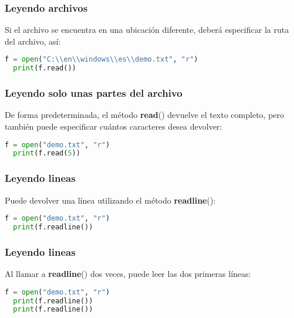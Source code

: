 \begin{frame}[fragile]
  \frametitle{Leyendo archivos}

  Si el archivo se encuentra en una ubicación diferente,
  deberá especificar la ruta del archivo, así: 

  \vspace{\baselineskip}
  \begin{lstlisting}[language=Python]
  f = open("C:\\en\\windows\\es\\demo.txt", "r")
  print(f.read())
  \end{lstlisting}
\end{frame}

\begin{frame}[fragile]
  \frametitle{Leyendo solo unas partes del archivo}

  De forma predeterminada, el método \textbf{read}() devuelve el texto
  completo, pero también puede especificar cuántos caracteres
  desea devolver:

  \vspace{\baselineskip}
  \begin{lstlisting}[language=Python]
  f = open("demo.txt", "r")
  print(f.read(5))
  \end{lstlisting}
\end{frame}

\begin{frame}[fragile]
  \frametitle{Leyendo lineas}

  Puede devolver una línea utilizando el método
  \textbf{readline}():

  \vspace{\baselineskip}
  \begin{lstlisting}[language=Python]
  f = open("demo.txt", "r")
  print(f.readline())
  \end{lstlisting}
\end{frame}

\begin{frame}[fragile]
  \frametitle{Leyendo lineas}

  Al llamar a \textbf{readline}() dos veces, puede leer
  las dos primeras líneas:

  \vspace{\baselineskip}
  \begin{lstlisting}[language=Python]
  f = open("demo.txt", "r")
  print(f.readline())
  print(f.readline())
  \end{lstlisting}
\end{frame}

